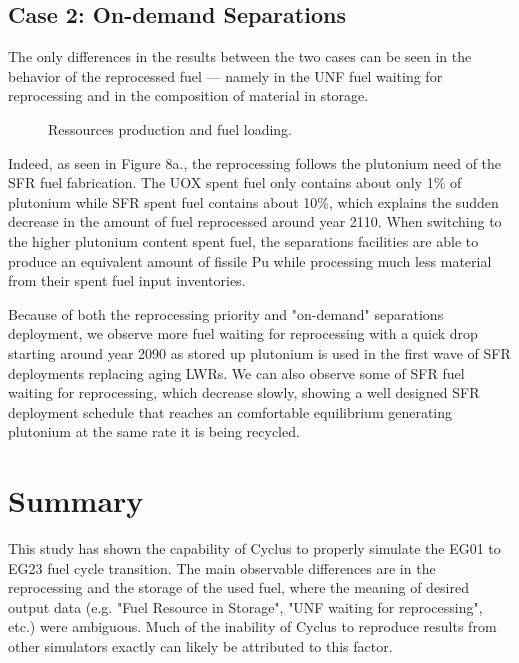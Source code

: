 \documentclass[12pt]{article}
\begin{document}
\subsection{Case 2: On-demand Separations}

The only differences in the results between the two cases can be seen in the
behavior of the reprocessed fuel --- namely in the UNF fuel waiting for
reprocessing and in the composition of material in storage.

\begin{figure}[h!]
    \centering
    \caption{Ressources production and fuel loading.\label{fig:ARR_FWR_SFC_2} }
\end{figure}

Indeed, as seen in Figure 8a., the reprocessing follows the plutonium need of
the SFR fuel fabrication. The UOX spent fuel only contains about only 1\% of
plutonium while SFR spent fuel contains about 10\%, which explains the sudden
decrease in the amount of fuel reprocessed around year 2110.  When switching
to the higher plutonium content spent fuel, the separations facilities are
able to produce an equivalent amount of fissile Pu while processing much less
material from their spent fuel input inventories.

Because of both the reprocessing priority and "on-demand" separations
deployment, we observe more fuel waiting for reprocessing with a quick drop
starting around year 2090 as stored up plutonium is used in the first wave of
SFR deployments replacing aging LWRs.  We can also observe some of SFR fuel
waiting for reprocessing, which decrease slowly, showing a well designed SFR
deployment schedule that reaches an comfortable equilibrium generating
plutonium at the same rate it is being recycled.

\section{Summary}

This study has shown the capability of Cyclus to properly simulate the EG01 to
EG23 fuel cycle transition.  The main observable differences are in the
reprocessing and the storage of the used fuel, where the meaning of desired
output data (e.g. "Fuel Resource in Storage", "UNF waiting for reprocessing",
etc.) were ambiguous.  Much of the inability of Cyclus to reproduce results
from other simulators exactly can likely be attributed to this factor.
\end{document}
